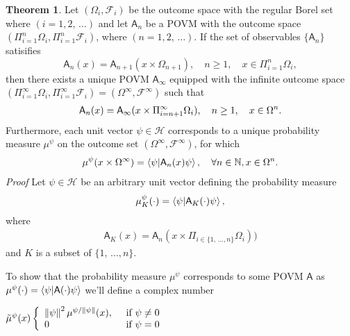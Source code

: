 \documentclass[a4paper,12pt]{wihuri}
\theoremstyle{definition}
\newtheorem{theorem}{Theorem}
\numberwithin{definition}{section}
\numberwithin{example}{section}
\numberwithin{theorem}{section}
\numberwithin{proposition}{section}
\numberwithin{lemma}{section}
\newcommand{\hi}{\mathcal{H}}%
\newcommand{\salg}{\mathcal{F}}%
\newcommand{\A}{\mathsf{A}}%
\newcommand{\nat}{\mathbb{N}}
\newcommand{\norm}[1]{\left\lVert#1\right\rVert}
\begin{document}
\begin{theorem}
Let $(\Omega_i, \salg_i)$ be the outcome space with the regular Borel set where $(i = 1,2,\,\ldots)$ and let $\A_n$ be a POVM with the outcome space $(\Pi_{i=1}^n\Omega_i,\Pi_{i=1}^n \salg_i)$, where $(n = 1,2,\,\ldots)$. If the set of observables $\{ \A_n \}$ satisifies
\begin{equation}\label{kolmogorov_const}
\A_n(x) = \A_{n+1}(x\times\Omega_{n+1}),\quad n \geq 1, \quad x \in \Pi_{i=1}^n\Omega_i,
\end{equation}
then there exists a unique POVM $\A_{\infty}$ equipped with the infinite outcome space $(\Pi_{i=1}^{\infty}\Omega_i, \Pi_{i=1}^{\infty} \salg_i) = (\Omega^{\infty}, \salg^{\infty})$ such that
\begin{align*}
\A_n(x) = \A_{\infty}(x \times \Pi_{i=n+1}^{\infty}\Omega_i),\quad n \geq 1, \quad x \in \Omega^n\text.
\end{align*}
Furthermore, each unit vector $\psi \in \hi$ corresponds to a unique probability measure $\mu^\psi$ on the outcome set $(\Omega^\infty, \salg^\infty)$, for which
\begin{align*}
\mu^\psi(x \times \Omega^\infty) = \braket{\psi|\A_n(x)\psi}, \quad \forall n \in \nat, x \in \Omega^n\text.
\end{align*}   
\noindent \textit{Proof} Let $\psi \in \hi$ be an arbitrary unit vector defining the probability measure
\begin{align*}
\mu_K^\psi(\cdot) = \braket{\psi | \A_K(\cdot)\psi},
\end{align*}
where
\begin{align*}
\A_K(x) = \A_n(x \times \Pi_{i\in \{1,\,\ldots ,n\}} \Omega_i))
\end{align*}
and $K$ is a subset of $\{1,\,\ldots ,n\}$.


To show that the probability measure $\mu^\psi$ corresponds to some POVM $\A$ as $\mu^\psi(\cdot) = \braket{\psi|\A(\cdot )\psi}$ we'll define a complex number
\begin{center}
$\tilde{\mu}^\psi(x)\left\{\begin{array}{r}
\norm{\psi}^2 \mu^{\psi / \norm{\psi}}(x), \quad \text{ if }\psi \neq 0 \\
0 \hfill\quad\text{ if } \psi = 0 
\end{array} \right.$


\end{center}
\end{theorem}
\end{document}
